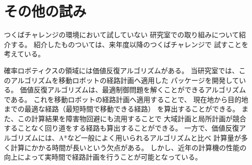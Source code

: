 \documentclass[twocolumn,9pt]{jsproceedings}
\begin{document}



\section{その他の試み}

つくばチャレンジの環境において試していない
研究室での取り組みについて紹介する。
紹介したものついては、来年度以降のつくばチャレンジで
試すことを考えている。

確率ロボティクスの領域には価値反復アルゴリズム\cite{詳解}\cite{青い本}がある。
当研究室では、このアルゴリズムを移動ロボットの経路計画へ適用した
パッケージを開発している\cite{ueda2023JRM}。
価値反復アルゴリズムは、最適制御問題を解くことができるアルゴリズムである。
これを移動ロボットの経路計画へ適用することで、
現在地から目的地までの最適な経路（最短時間で移動できる経路）
を算出することができる。
また、この計算結果を障害物回避にも流用することで
大域計画と局所計画が競合することなく回り道をする経路も算出することができる。
一方で、価値反復アルゴリズムには、A*など一般によく用いられるアルゴリズムと比べ
計算量が多く計算にかかる時間が長いという欠点がある。
しかし、近年の計算機の性能の向上によって実時間で経路計画を行うことが可能となっている。
\end{document}
